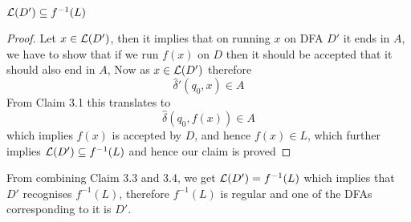\begin{soln}
	\begin{claim}
		$\mathcal{L}(D') \subseteq f^{-1}(L)$
	\end{claim}
	\begin{proof}
		Let $x\in \mathcal{L}(D')$, then it implies that on running $x$ on DFA $D'$ it ends in $A$, we have to show that if we run $f(x)$ on $D$ then it should be accepted that it should also end in $A$,
		\newline Now as $x\in \mathcal{L}(D')$ therefore
		$$ \hat\delta'(q_0,x) \in A $$
		From Claim 3.1 this translates to
		$$ \hat\delta(q_0,f(x)) \in A $$
		which implies $f(x)$ is accepted by $D$, and hence $f(x) \in L$, which further implies $ \mathcal{L}(D') \subseteq  f^{-1}(L)$ and hence our claim is proved
	\end{proof}
	From combining Claim 3.3 and 3.4, we get $\mathcal{L}(D')=f^{-1}(L)$ which implies that $D'$ recognises $f^{-1}(L)$, therefore $f^{-1}(L)$ is regular and one of the DFAs corresponding to it is $D'$.
\end{soln}
